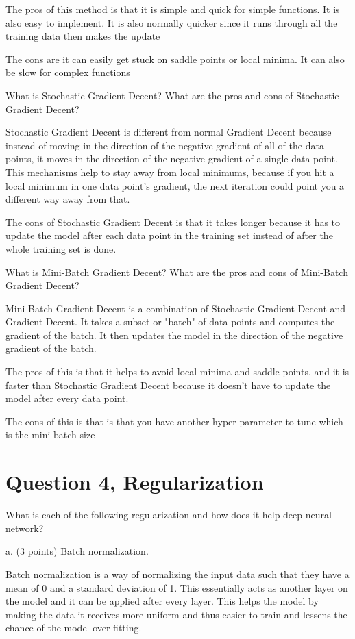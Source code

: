 \documentclass{article}
\begin{document}
The pros of this method is that it is simple and quick for simple functions. It is also easy to implement. It is also normally quicker since it runs through all the training data then makes the update

The cons are it can easily get stuck on saddle points or local minima. It can also be slow for complex functions


What is Stochastic Gradient Decent? What are the pros and cons of Stochastic Gradient Decent?


Stochastic Gradient Decent is different from normal Gradient Decent because instead of moving in the direction of the negative gradient of all of the data points, it moves in the direction of the negative gradient of a single data point.
This mechanisms help to stay away from local minimums, because if you hit a local minimum in one data point's gradient, the next iteration could point you a different way away from that.

The cons of Stochastic Gradient Decent is that it takes longer because it has to update the model after each data point in the training set instead of after the whole training set is done.

What is Mini-Batch Gradient Decent? What are the pros and cons of Mini-Batch Gradient Decent?

Mini-Batch Gradient Decent is a combination of Stochastic Gradient Decent and Gradient Decent. It takes a subset or "batch" of data points and computes the gradient of the batch. It then updates the model in the direction of the negative gradient of the batch.

The pros of this is that it helps to avoid local minima and saddle points, and it is faster than Stochastic Gradient Decent because it doesn't have to update the model after every data point.

The cons of this is that is that you have another hyper parameter to tune which is the mini-batch size



\section*{Question 4, Regularization}

What is each of the following regularization and how does it help deep neural network?

a. (3 points) Batch normalization.

Batch normalization is a way of normalizing the input data such that they have a mean of 0 and a standard deviation of 1. This essentially acts as another layer on the model and it can be applied after every layer. This helps the model by making the data it receives more uniform and thus easier to train and lessens the chance of the model over-fitting.
\end{document}
